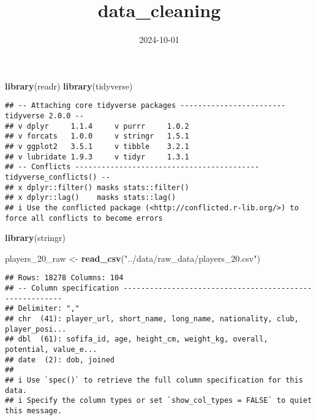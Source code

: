 \documentclass[
]{article}
\title{data\_cleaning}
\author{}
\date{\vspace{-2.5em}2024-10-01}
\newenvironment{Shaded}{\begin{snugshade}}{\end{snugshade}}
\newcommand{\FunctionTok}[1]{\textcolor[rgb]{0.13,0.29,0.53}{\textbf{#1}}}
\newcommand{\NormalTok}[1]{#1}
\newcommand{\OtherTok}[1]{\textcolor[rgb]{0.56,0.35,0.01}{#1}}
\newcommand{\StringTok}[1]{\textcolor[rgb]{0.31,0.60,0.02}{#1}}
\begin{document}
\maketitle

\begin{Shaded}
\begin{Highlighting}[]
\FunctionTok{library}\NormalTok{(readr)}
\FunctionTok{library}\NormalTok{(tidyverse)}
\end{Highlighting}
\end{Shaded}

\begin{verbatim}
## -- Attaching core tidyverse packages ------------------------ tidyverse 2.0.0 --
## v dplyr     1.1.4     v purrr     1.0.2
## v forcats   1.0.0     v stringr   1.5.1
## v ggplot2   3.5.1     v tibble    3.2.1
## v lubridate 1.9.3     v tidyr     1.3.1
## -- Conflicts ------------------------------------------ tidyverse_conflicts() --
## x dplyr::filter() masks stats::filter()
## x dplyr::lag()    masks stats::lag()
## i Use the conflicted package (<http://conflicted.r-lib.org/>) to force all conflicts to become errors
\end{verbatim}

\begin{Shaded}
\begin{Highlighting}[]
\FunctionTok{library}\NormalTok{(stringr)}
\end{Highlighting}
\end{Shaded}

\begin{Shaded}
\begin{Highlighting}[]
\NormalTok{players\_20\_raw }\OtherTok{\textless{}{-}} \FunctionTok{read\_csv}\NormalTok{(}\StringTok{"../data/raw\_data/players\_20.csv"}\NormalTok{)}
\end{Highlighting}
\end{Shaded}

\begin{verbatim}
## Rows: 18278 Columns: 104
## -- Column specification --------------------------------------------------------
## Delimiter: ","
## chr  (41): player_url, short_name, long_name, nationality, club, player_posi...
## dbl  (61): sofifa_id, age, height_cm, weight_kg, overall, potential, value_e...
## date  (2): dob, joined
## 
## i Use `spec()` to retrieve the full column specification for this data.
## i Specify the column types or set `show_col_types = FALSE` to quiet this message.
\end{verbatim}
\end{document}
